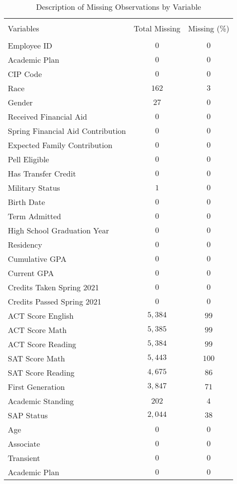 \documentclass[12pt]{article}
\begin{document}
\begin{table}[!htbp] \centering 
 \caption{Description of Missing Observations by Variable} %
 \label{}  %
\begin{tabular}{@{\extracolsep{5pt}} lcc} %
\\[-1.8ex]\hline 
\hline \\[-1.8ex]  %
 Variables & Total Missing & Missing (\%)\\ 
\hline \\[-1.8ex] 
 Employee ID & $0$ & $0$ \\  %
 Academic Plan & $0$ & $0$ \\ 
CIP Code & $0$ & $0$ \\ 
Race & $162$ & $3$ \\ 
Gender & $27$ & $0$ \\ 
Received Financial Aid & $0$ & $0$ \\ 
Spring Financial Aid Contribution & $0$ & $0$ \\ 
Expected Family Contribution & $0$ & $0$ \\ 
Pell Eligible & $0$ & $0$ \\ 
Has Transfer Credit & $0$ & $0$ \\ 
Military Status & $1$ & $0$ \\ 
Birth Date & $0$ & $0$ \\ 
 Term Admitted& $0$ & $0$ \\ 
High School Graduation Year & $0$ & $0$ \\ 
Residency & $0$ & $0$ \\ 
Cumulative GPA & $0$ & $0$ \\ 
 Current GPA & $0$ & $0$ \\ 
 Credits Taken Spring 2021 & $0$ & $0$ \\ 
 Credits Passed Spring 2021 & $0$ & $0$ \\ 
 ACT Score English & $5,384$ & $99$ \\ 
 ACT Score Math & $5,385$ & $99$ \\ 
 ACT Score Reading & $5,384$ & $99$ \\ 
 SAT Score Math & $5,443$ & $100$ \\ 
 SAT Score Reading & $4,675$ & $86$ \\ 
 First Generation & $3,847$ & $71$ \\ 
 Academic Standing & $202$ & $4$ \\ 
 SAP Status & $2,044$ & $38$ \\ 
 Age & $0$ & $0$ \\ 
 Associate & $0$ & $0$ \\ 
 Transient & $0$ & $0$ \\
 Academic Plan & $0$ & $0$ \\ 
 

\end{tabular}
\end{table}
\end{document}
